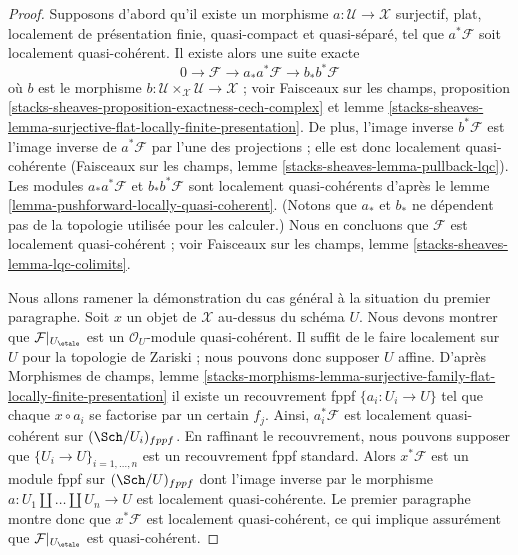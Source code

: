 \begin{proof}
Supposons d'abord qu'il existe un morphisme $a : \mathcal{U} \to \mathcal{X}$
surjectif, plat, localement de présentation finie, quasi-compact
et quasi-séparé, tel que $a^*\mathcal{F}$ soit localement quasi-cohérent.
Il existe alors une suite exacte
$$
0 \to \mathcal{F} \to a_*a^*\mathcal{F} \to b_*b^*\mathcal{F}
$$
où $b$ est le morphisme
$b : \mathcal{U} \times_\mathcal{X} \mathcal{U} \to \mathcal{X}$ ; voir
Faisceaux sur les champs, proposition
\ref{stacks-sheaves-proposition-exactness-cech-complex} et
lemme \ref{stacks-sheaves-lemma-surjective-flat-locally-finite-presentation}.
De plus, l'image inverse $b^*\mathcal{F}$ est l'image inverse de $a^*\mathcal{F}$
par l'une des projections ; elle est donc localement quasi-cohérente
(Faisceaux sur les champs, lemme \ref{stacks-sheaves-lemma-pullback-lqc}).
Les modules $a_*a^*\mathcal{F}$ et $b_*b^*\mathcal{F}$ sont localement
quasi-cohérents d'après le lemme \ref{lemma-pushforward-locally-quasi-coherent}.
(Notons que $a_*$ et $b_*$ ne dépendent pas de la topologie
utilisée pour les calculer.)
Nous en concluons que $\mathcal{F}$ est localement quasi-cohérent ; voir
Faisceaux sur les champs, lemme \ref{stacks-sheaves-lemma-lqc-colimits}.

\medskip\noindent
Nous allons ramener la démonstration du cas général à la
situation du premier paragraphe. Soit $x$ un objet de $\mathcal{X}$
au-dessus du schéma $U$. Nous devons montrer que
$\mathcal{F}|_{U_\etale}$ est un $\mathcal{O}_U$-module quasi-cohérent.
Il suffit de le faire localement sur $U$ pour la topologie de Zariski ; nous pouvons donc
supposer $U$ affine. D'après
Morphismes de champs, lemme
\ref{stacks-morphisms-lemma-surjective-family-flat-locally-finite-presentation}
il existe un recouvrement fppf $\{a_i : U_i \to U\}$ tel que
chaque $x \circ a_i$ se factorise par un certain $f_j$. Ainsi, $a_i^*\mathcal{F}$
est localement quasi-cohérent sur $(\Sch/U_i)_{fppf}$. En raffinant
le recouvrement, nous pouvons supposer que $\{U_i \to U\}_{i = 1, \ldots, n}$
est un recouvrement fppf standard. Alors $x^*\mathcal{F}$ est un
module fppf sur $(\Sch/U)_{fppf}$ dont l'image inverse par le morphisme
$a : U_1 \amalg \ldots \amalg U_n \to U$ est localement quasi-cohérente.
Le premier paragraphe montre donc que $x^*\mathcal{F}$ est localement
quasi-cohérent, ce qui implique assurément que $\mathcal{F}|_{U_\etale}$
est quasi-cohérent.
\end{proof}






